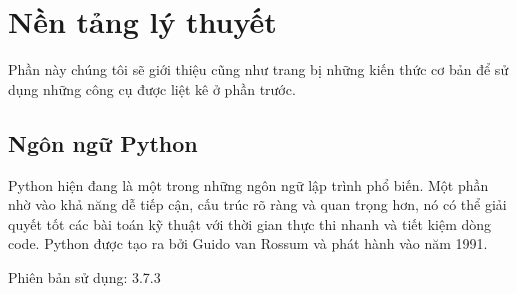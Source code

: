 \chapter{Nền tảng lý thuyết}
Phần này chúng tôi sẽ giới thiệu cũng như trang bị những kiến thức cơ bản để sử dụng những công cụ được liệt kê ở phần trước.
\section{Ngôn ngữ Python}
Python hiện đang là một trong những ngôn ngữ lập trình phổ biến. Một phần nhờ vào khả năng dễ tiếp cận, cấu trúc rõ ràng và quan trọng hơn, nó có thể giải quyết tốt các bài toán kỹ thuật với thời gian thực thi nhanh và tiết kiệm dòng code. Python được tạo ra bởi Guido van Rossum và phát hành vào năm 1991.\cite{python}
\par
Phiên bản sử dụng: 3.7.3
